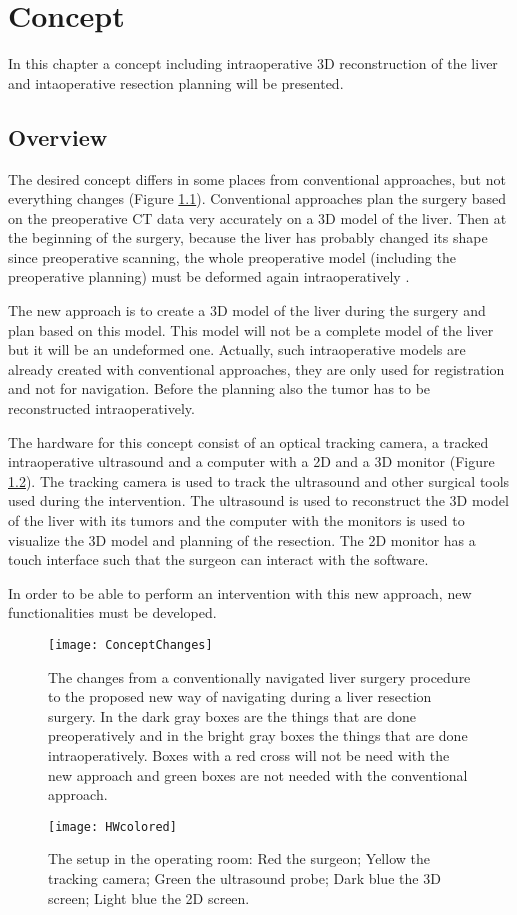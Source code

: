 \chapter{Concept}
In this chapter a concept including intraoperative 3D reconstruction of the liver and
intaoperative resection planning will be presented. 

\section{Overview}
The desired concept differs in some places from conventional approaches, but not
everything changes (Figure \ref{fig:ConceptChanges}). Conventional approaches
plan the surgery based on the preoperative CT data very accurately on a 
3D model of the liver. Then at the
beginning of
the surgery, because the liver has probably changed its shape since preoperative
scanning, the whole preoperative model (including the preoperative planning) must be deformed again 
intraoperatively \cite{payan2012soft}.

The new approach is to create a 3D model of the liver during
the surgery and plan based on this model. This model will not be a complete
model of the liver but it will be an undeformed one. Actually, such
intraoperative models are already created with conventional approaches, they are only used for registration
and not for navigation. Before the planning also the tumor has to be
reconstructed intraoperatively.

The hardware for this concept consist of an optical tracking camera, a tracked
intraoperative ultrasound and a computer with a 2D and a 3D monitor (Figure \ref{fig:HWcolored}). The
tracking camera is used to track the ultrasound and other surgical tools used
during the intervention. The ultrasound is used to reconstruct the 3D model of
the liver with its tumors and the computer with the monitors is used to
visualize the 3D model and planning of the resection. The 2D monitor has a touch
interface such that the surgeon can interact with the software.

In order to be able to perform an intervention with this new approach, new
functionalities must be developed.
\begin{figure}[H]
  \centering
  \texttt{[image: ConceptChanges]}
  \caption{The changes from a conventionally navigated liver surgery procedure to the
    proposed new way of navigating during a liver resection surgery. In the dark gray boxes are the things
  that are done preoperatively and in the bright gray boxes the things that are
  done intraoperatively. Boxes with
    a red cross will not be need with the new approach and green boxes are not
    needed with the conventional approach.}
  \label{fig:ConceptChanges}
\end{figure}
\begin{figure}[H]
  \centering
  \texttt{[image: HWcolored]}
  \caption{The setup in the operating room: Red the surgeon; Yellow the
    tracking camera; Green the ultrasound probe; Dark blue the 3D screen; Light
    blue the 2D screen.}
  \label{fig:HWcolored}
\end{figure}


